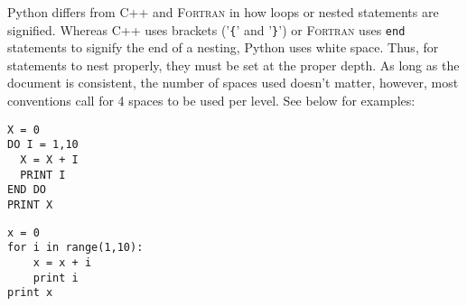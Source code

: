 \documentclass[a4paper,11pt]{report}
\begin{document}
Python differs from C++ and \textsc{Fortran} in how loops or nested statements are signified. Whereas
C++ uses brackets ('\verb|{|' and '\verb|}|') or \textsc{Fortran} uses \verb|end| statements to signify the end of a
nesting, Python uses white space. Thus, for statements to nest properly, they must be set at the 
proper depth. As long as the document is consistent, the number of spaces used doesn't matter, however,
most conventions call for 4 spaces to be used per level. See below for examples:

\begin{Verbatim}[frame=single, label=\textsc{Fortran}, baselinestretch=1, fontsize=\small]
X = 0
DO I = 1,10
  X = X + I
  PRINT I
END DO
PRINT X
\end{Verbatim}

\begin{Verbatim}[frame=single, label=Python, baselinestretch=1, fontsize=\small]
x = 0
for i in range(1,10):
    x = x + i
    print i
print x
\end{Verbatim}










 
\end{document}
